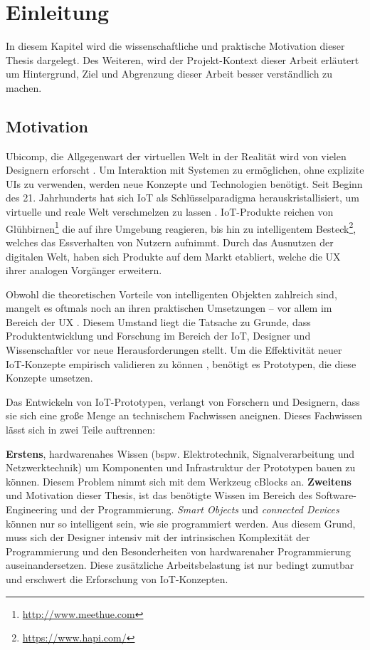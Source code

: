\chapter{Einleitung}\label{sec:1_einleitung}
In diesem Kapitel wird die wissenschaftliche und praktische Motivation dieser Thesis dargelegt. Des Weiteren, wird der Projekt-Kontext dieser Arbeit erläutert um Hintergrund, Ziel und Abgrenzung dieser Arbeit besser verständlich zu machen.


\section{Motivation}\label{sec:1_motivation}
\ac{Ubicomp}, die Allgegenwart der virtuellen Welt in der Realität wird von vielen Designern erforscht \cite{Kuniavsky.2010}. Um Interaktion mit Systemen zu ermöglichen, ohne explizite \acp{UI} zu verwenden, werden neue Konzepte und Technologien benötigt. Seit Beginn des 21. Jahrhunderts hat sich \ac{IoT} als Schlüsselparadigma herauskristallisiert, um virtuelle und reale Welt verschmelzen zu lassen \cite{Gubbi.2013}. \ac{IoT}-Produkte reichen von Glühbirnen\footnote{\url{http://www.meethue.com}} die auf ihre Umgebung reagieren, bis hin zu intelligentem Besteck\footnote{\url{https://www.hapi.com/}}, welches das Essverhalten von Nutzern aufnimmt. Durch das Ausnutzen der digitalen Welt, haben sich Produkte auf dem Markt etabliert, welche die \ac{UX} ihrer analogen Vorgänger erweitern.

Obwohl die theoretischen Vorteile von intelligenten Objekten zahlreich sind, mangelt es oftmals noch an ihren praktischen Umsetzungen -- vor allem im Bereich der \ac{UX} \cite{Resnick.2013}. Diesem Umstand liegt die Tatsache zu Grunde, dass Produktentwicklung und Forschung im Bereich der \ac{IoT}, Designer und Wissenschaftler vor neue Herausforderungen stellt. Um die Effektivität neuer \ac{IoT}-Konzepte empirisch validieren zu können \cite{Robinson.2018}, benötigt es Prototypen, die diese Konzepte umsetzen. 

Das Entwickeln von \ac{IoT}-Prototypen, verlangt von Forschern und Designern, dass sie sich eine große Menge an technischem Fachwissen aneignen. Dieses Fachwissen lässt sich in zwei Teile auftrennen: 

\textbf{Erstens}, hardwarenahes Wissen (bspw. Elektrotechnik, Signalverarbeitung und Netzwerktechnik) um Komponenten und Infrastruktur der Prototypen bauen zu können. Diesem Problem nimmt sich \cite{weckbach2018cblocks} mit dem Werkzeug \acp{cBlock} an. \textbf{Zweitens} und Motivation dieser Thesis, ist das benötigte Wissen im Bereich des Software-Engineering und der Programmierung. \textit{Smart Objects} und \textit{connected Devices} können nur so intelligent sein, wie sie programmiert werden. Aus diesem Grund, muss sich der Designer intensiv mit der intrinsischen Komplexität der Programmierung und den Besonderheiten von hardwarenaher Programmierung auseinandersetzen. Diese zusätzliche Arbeitsbelastung ist nur bedingt zumutbar und erschwert die Erforschung von \ac{IoT}-Konzepten.

